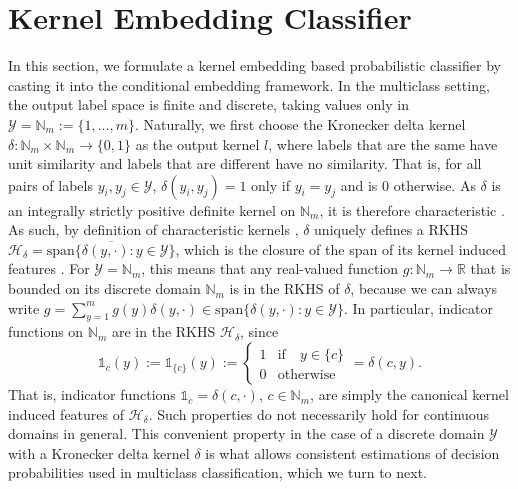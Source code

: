 \documentclass{article}
\begin{document}
\section{Kernel Embedding Classifier}
\label{sec:kernel_embedding_classifier}

	In this section, we formulate a kernel embedding based probabilistic classifier by casting it into the conditional embedding framework. In the multiclass setting, the output label space is finite and discrete, taking values only in $\mathcal{Y} = \mathbb{N}_{m} := \{1, \dots, m\}$. Naturally, we first choose the Kronecker delta kernel $\delta : \mathbb{N}_{m} \times \mathbb{N}_{m} \to \{0, 1\}$ as the output kernel $l$, where labels that are the same have unit similarity and labels that are different have no similarity. That is, for all pairs of labels $y_{i}, y_{j} \in \mathcal{Y}$, $\delta(y_{i}, y_{j}) = 1$ only if $y_{i} = y_{j}$ and is $0$ otherwise. As $\delta$ is an integrally strictly positive definite kernel on $\mathbb{N}_{m}$, it is therefore characteristic \citep[Theorem 7]{sriperumbudur2010hilbert}. As such, by definition of characteristic kernels \citep{fukumizu2004dimensionality}, $\delta$ uniquely defines a RKHS  $\mathcal{H}_{\delta} = \overline{\mathrm{span}\{\delta(y, \cdot) : y \in \mathcal{Y}\}}$, which is the closure of the span of its kernel induced features \citep{xu2009refinement}. For $\mathcal{Y} = \mathbb{N}_{m}$, this means that any real-valued function $g : \mathbb{N}_{m} \to \mathbb{R}$ that is bounded on its discrete domain $\mathbb{N}_{m}$ is in the RKHS of $\delta$, because we can always write $g = \sum_{y = 1}^{m} g(y) \delta(y, \cdot) \in \mathrm{span}\{\delta(y, \cdot) : y \in \mathcal{Y}\}$. In particular, indicator functions on $\mathbb{N}_{m}$ are in the RKHS $\mathcal{H}_{\delta}$, since
	\begin{equation}
		\mathbb{1}_{c}(y) := \mathbb{1}_{\{c\}}(y) := \begin{cases}
		1 & \mathrm{if } \quad y \in \{c\} \\
		0 & \mathrm{otherwise}
		\end{cases} = \delta(c, y).
	\label{eq:indicator_function}
	\end{equation}
	That is, indicator functions $\mathbb{1}_{c} = \delta(c, \cdot)$, $c \in \mathbb{N}_{m}$, are simply the canonical kernel induced features of $\mathcal{H}_{\delta}$. Such properties do not necessarily hold for continuous domains in general. This convenient property in the case of a discrete domain $\mathcal{Y}$ with a Kronecker delta kernel $\delta$ is what allows consistent estimations of decision probabilities used in multiclass classification, which we turn to next.
	
\end{document}
